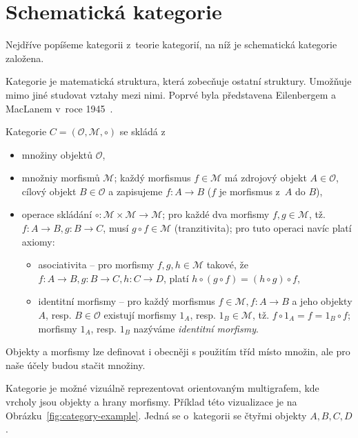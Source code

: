 \section{Schematická kategorie}

Nejdříve popíšeme kategorii z~teorie kategorií, na níž je schematická kategorie založena.

Kategorie je matematická struktura, která zobecňuje ostatní struktury.
Umožňuje mimo jiné studovat vztahy mezi nimi.
Poprvé byla představena Eilenbergem a MacLanem v~roce 1945~\cite{eilenberg_1945}.

Kategorie $C=(\mathcal O, \mathcal M, \circ)$ se skládá
z~\begin{itemize}
  \item množiny objektů $\mathcal O$,
  \item množniy morfismů $\mathcal M$; každý morfismus $f \in \mathcal M$ má zdrojový objekt $A\in\mathcal O$, cílový objekt $B\in\mathcal O$ a zapisujeme $f: A\to B$ ($f$ je morfismus z~$A$ do $B$),
  \item operace skládání $\circ\colon \mathcal M\times\mathcal M \to \mathcal M$; pro každé dva morfismy $f,g\in\mathcal M$, tž. $f\colon A\to B, g\colon B\to C$, musí $g\circ f\in \mathcal M$ (tranzitivita); pro tuto operaci navíc platí axiomy:
        \begin{itemize}
          \item asociativita -- pro morfismy $f,g,h\in\mathcal M$ takové, že $f\colon A\to B, g\colon B\to C, h\colon C\to D$, platí $h\circ (g \circ f) = (h\circ g)\circ f$,
          \item identitní morfismy -- pro každý morfismus $f\in\mathcal M, f\colon A\to B$ a jeho objekty $A$, resp. $B\in\mathcal O$ existují morfismy $1_A$, resp. $1_B\in\mathcal M$, tž. $f\circ 1_A = f = 1_B\circ f$; morfismy $1_A$, resp. $1_B$ nazýváme \emph{identitní morfismy}.
        \end{itemize}
\end{itemize}

Objekty a morfismy lze definovat i obecněji s použitím tříd místo množin, ale pro naše účely budou stačit množiny.

Kategorie je možné vizuálně reprezentovat orientovaným multigrafem, kde vrcholy jsou objekty a hrany morfismy.
Příklad této vizualizace je na Obrázku~\ref{fig:category-example}.
Jedná se o~kategorii se čtyřmi objekty $A, B, C, D$.

